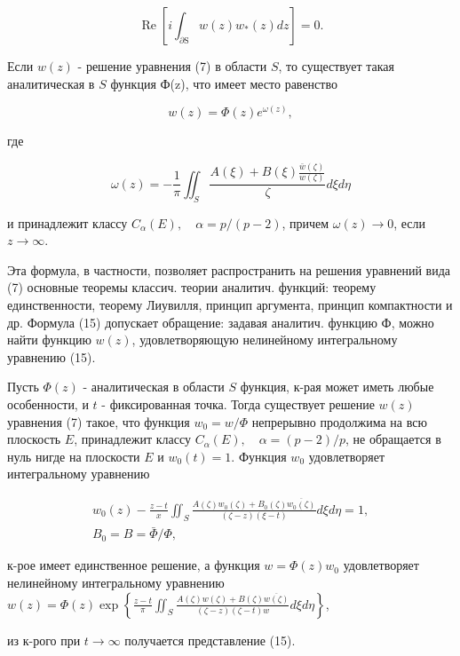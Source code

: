 \documentclass[10pt]{article}
\begin{document}
\[

\operatorname{Re}\left[i \int_{\partial \mathrm{S}} w(z) w_{*}(z) d z\right]=0 .

\]



Если $w(z)$ - решение уравнения (7) в области $S$, то существует такая аналитическая в $S$ функция Ф(z), что имеет место равенство



\[

w(z)=\Phi(z) e^{\omega(z)},

\]



где



\[

\omega(z)=-\frac{1}{\pi} \iint_{S} \frac{A(\xi)+B(\xi) \frac{\bar{w}(\zeta)}{w(\zeta)}}{\zeta} d \xi d \eta

\]



и принадлежит классу $C_{\alpha}(E), \quad \alpha=p /(p-2)$, причем $\omega(z) \rightarrow 0$, если $z \rightarrow \infty$.



Эта формула, в частности, позволяет распространить на решения уравнений вида (7) основные теоремы классич. теории аналитич. функций: теорему единственности, теорему Лиувилля, принцип аргумента, принцип компактности и др. Формула (15) допускает обращение: задавая аналитич. функцию Ф, можно найти функцию $w(z)$, удовлетворяющую нелинейному интегральному уравнению (15).



Пусть $\Phi(z)$ - аналитическая в области $S$ функция, к-рая может иметь любые особенности, и $t$ - фиксированная точка. Тогда существует решение $w(z)$ уравнения (7) такое, что функция $w_{0}=w / \Phi$ непрерывно продолжима на всю плоскость $E$, принадлежит классу $C_{\alpha}(E), \quad \alpha=(p-2) / p$, не обращается в нуль нигде на плоскости $E$ и $w_{0}(t)=1$. Функция $w_{0}$ удовлетворяет интегральному уравнению



\[

\begin{gathered}

w_{0}(z)-\frac{z-t}{x} \iint_{S} \frac{A(\zeta) w_{0}(\zeta)+B_{0}(\zeta) \overline{w_{0}(\zeta)}}{(\zeta-z)(\xi-t)} d \xi d \eta=1, \\

B_{0}=B=\bar{\Phi} / \Phi,

\end{gathered}

\]



к-рое имеет единственное решение, а функция $w=\Phi(z) w_{0}$ удовлетворяет нелинейному интегральному уравнению $w(z)=\Phi(z) \exp \left\{\frac{z-t}{\pi} \iint_{S} \frac{A(\zeta) w(\zeta)+B(\zeta) \overline{w(\zeta)}}{(\zeta-z)(\zeta-t) w} d \xi d \eta\right\}$,



из к-рого при $t \rightarrow \infty$ получается представление (15).
\end{document}
